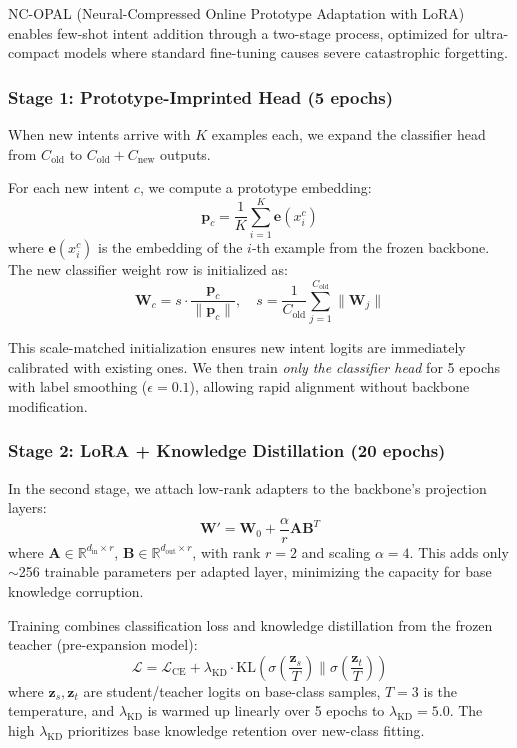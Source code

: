 \documentclass[11pt]{article}
\begin{document}
NC-OPAL (Neural-Compressed Online Prototype Adaptation with LoRA) enables few-shot intent addition through a two-stage process, optimized for ultra-compact models where standard fine-tuning causes severe catastrophic forgetting.

\subsubsection{Stage 1: Prototype-Imprinted Head (5 epochs)}

When new intents arrive with $K$ examples each, we expand the classifier head from $C_{\text{old}}$ to $C_{\text{old}} + C_{\text{new}}$ outputs.

For each new intent $c$, we compute a prototype embedding:
\begin{equation}
\mathbf{p}_c = \frac{1}{K} \sum_{i=1}^{K} \mathbf{e}(x_i^c)
\end{equation}
where $\mathbf{e}(x_i^c)$ is the embedding of the $i$-th example from the frozen backbone.
The new classifier weight row is initialized as:
\begin{equation}
\mathbf{W}_{c} = s \cdot \frac{\mathbf{p}_c}{\|\mathbf{p}_c\|}, \quad s = \frac{1}{C_{\text{old}}} \sum_{j=1}^{C_{\text{old}}} \|\mathbf{W}_j\|
\end{equation}

This scale-matched initialization ensures new intent logits are immediately calibrated with existing ones.
We then train \emph{only the classifier head} for 5 epochs with label smoothing ($\epsilon=0.1$), allowing rapid alignment without backbone modification.

\subsubsection{Stage 2: LoRA + Knowledge Distillation (20 epochs)}

In the second stage, we attach low-rank adapters \cite{hu2022lora} to the backbone's projection layers:
\begin{equation}
\mathbf{W}' = \mathbf{W}_0 + \frac{\alpha}{r} \mathbf{A}\mathbf{B}^T
\end{equation}
where $\mathbf{A} \in \mathbb{R}^{d_{\text{in}} \times r}$, $\mathbf{B} \in \mathbb{R}^{d_{\text{out}} \times r}$, with rank $r=2$ and scaling $\alpha=4$.
This adds only $\sim$256 trainable parameters per adapted layer, minimizing the capacity for base knowledge corruption.

Training combines classification loss and knowledge distillation from the frozen teacher (pre-expansion model):
\begin{equation}
\mathcal{L} = \mathcal{L}_{\text{CE}} + \lambda_{\text{KD}} \cdot \text{KL}\left(\sigma\left(\frac{\mathbf{z}_s}{T}\right) \| \sigma\left(\frac{\mathbf{z}_t}{T}\right)\right)
\end{equation}
where $\mathbf{z}_s, \mathbf{z}_t$ are student/teacher logits on base-class samples, $T=3$ is the temperature, and $\lambda_{\text{KD}}$ is warmed up linearly over 5 epochs to $\lambda_{\text{KD}}=5.0$.
The high $\lambda_{\text{KD}}$ prioritizes base knowledge retention over new-class fitting.
\end{document}

